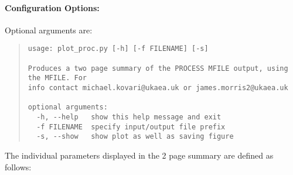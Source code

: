 \documentclass[11pt,a4paper]{article}
\begin{document}
\paragraph{Configuration Options:}

Optional arguments are:
\begin{quote}
\begin{verbatim}
usage: plot_proc.py [-h] [-f FILENAME] [-s]

Produces a two page summary of the PROCESS MFILE output, using the MFILE. For
info contact michael.kovari@ukaea.uk or james.morris2@ukaea.uk

optional arguments:
  -h, --help   show this help message and exit
  -f FILENAME  specify input/output file prefix
  -s, --show   show plot as well as saving figure
\end{verbatim}
\end{quote}

The individual parameters displayed in the 2 page summary are defined as follows:
\end{document}
